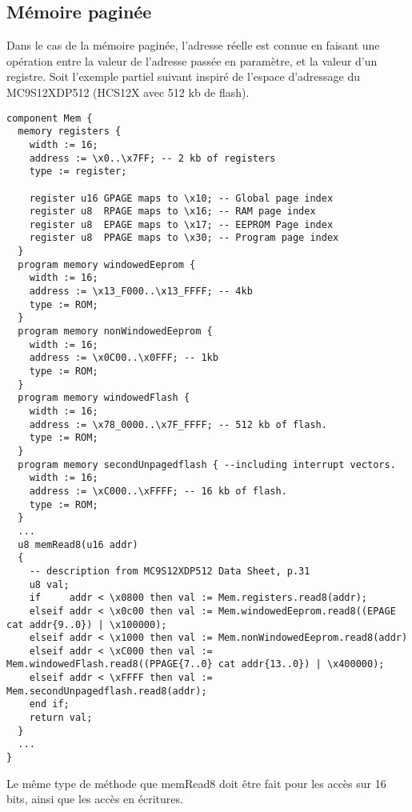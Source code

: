 \subsection{Mémoire paginée}
Dans le cas de la mémoire paginée, l'adresse réelle est connue en faisant une opération entre la valeur de l'adresse passée en paramètre, et la valeur d'un registre. Soit l'exemple partiel suivant inspiré de l'espace d'adressage du MC9S12XDP512 (HCS12X avec 512 kb de flash).
\begin{lstlisting}
component Mem {
  memory registers {
    width := 16;
    address := \x0..\x7FF; -- 2 kb of registers
    type := register;

    register u16 GPAGE maps to \x10; -- Global page index
    register u8  RPAGE maps to \x16; -- RAM page index
    register u8  EPAGE maps to \x17; -- EEPROM Page index
    register u8  PPAGE maps to \x30; -- Program page index
  }
  program memory windowedEeprom {
    width := 16;
    address := \x13_F000..\x13_FFFF; -- 4kb
    type := ROM;
  }
  program memory nonWindowedEeprom {
    width := 16;
    address := \x0C00..\x0FFF; -- 1kb
    type := ROM;
  }
  program memory windowedFlash {
    width := 16;
    address := \x78_0000..\x7F_FFFF; -- 512 kb of flash.
    type := ROM;
  }
  program memory secondUnpagedflash { --including interrupt vectors.
    width := 16;
    address := \xC000..\xFFFF; -- 16 kb of flash.
    type := ROM;
  }
  ...
  u8 memRead8(u16 addr)
  {
    -- description from MC9S12XDP512 Data Sheet, p.31
    u8 val;
    if     addr < \x0800 then val := Mem.registers.read8(addr);
    elseif addr < \x0c00 then val := Mem.windowedEeprom.read8((EPAGE cat addr{9..0}) | \x100000);
    elseif addr < \x1000 then val := Mem.nonWindowedEeprom.read8(addr)
    elseif addr < \xC000 then val := Mem.windowedFlash.read8((PPAGE{7..0} cat addr{13..0}) | \x400000);
    elseif addr < \xFFFF then val := Mem.secondUnpagedflash.read8(addr);
    end if;
    return val;
  }
  ...
}
\end{lstlisting}
Le même type de méthode que memRead8 doit être fait pour les accès sur 16 bits, ainsi que les accès en écritures.

